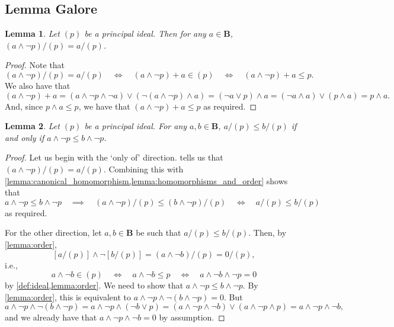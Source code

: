 \documentclass{article}
\newtheorem{lemma}{Lemma}
\theoremstyle{definition}
\theoremstyle{remark}
\begin{document}

\subsection{Lemma Galore}


\begin{lemma} \label{lemma:elements_in_quotients}
  Let $(p)$ be a principal ideal. Then for any $a \in \mathbf{B}$, $(a \land
  \neg p)/(p) = a/(p)$.
\end{lemma}
\begin{proof}
  Note that
  \[
    (a \land \neg p)/(p) = a/(p) \quad \iff \quad (a \land \neg p) + a \in (p)
    \quad \iff \quad (a \land \neg p) + a \le p.
  \]
  We also have that
  \[
    (a \land \neg p) + a = (a \land \neg p \land \neg a) \lor (\neg(a \land \neg
    p) \land a) = (\neg a \lor p) \land a = (\neg a \land a) \lor (p \land a) =
    p \land a.
  \]
  And, since $p \land a \le p$, we have that $(a \land \neg p) + a \le p$ as
  required.
\end{proof} %

\begin{lemma} \label{lemma:min_element_and_order}
  Let $(p)$ be a principal ideal. For any $a, b \in \mathbf{B}$, $a/(p) \le
  b/(p)$ if and only if $a \land \neg p \le b \land \neg p$.
\end{lemma}
\begin{proof}
  Let us begin with the `only of' direction. 
  tells us that $(a \land \neg p)/(p) = a/(p)$. Combining this with
  \cref{lemma:canonical_homomorphism,lemma:homomorphisms_and_order} shows that
  \[
    a \land \neg p \le b \land \neg p \quad \implies \quad (a \land \neg p)/(p)
    \le (b \land \neg p)/(p) \quad \iff \quad a/(p) \le b/(p)
  \]
  as required.

  For the other direction, let $a, b \in \mathbf{B}$ be such that $a/(p) \le
  b/(p)$. Then, by \cref{lemma:order},
  \[
    [a/(p)] \land \neg [b/(p)] = (a \land \neg b)/(p) = 0/(p),
  \]
  i.e.,
  \[
    a \land \neg b \in (p) \quad \iff \quad a \land \neg b \le p \quad \iff
    \quad a \land \neg b \land \neg p = 0
  \]
  by \cref{def:ideal,lemma:order}. We need to show that $a \land \neg p \le b
  \land \neg p$. By \cref{lemma:order}, this is equivalent to $a \land \neg p
  \land \neg(b \land \neg p) = 0$. But
  \[
    a \land \neg p \land \neg(b \land \neg p) = a \land \neg p \land (\neg b
    \lor p) = (a \land \neg p \land \neg b) \lor (a \land \neg p \land p) = a
    \land \neg p \land \neg b,
  \]
  and we already have that $a \land \neg p \land \neg b = 0$ by assumption.
\end{proof}
\end{document}
